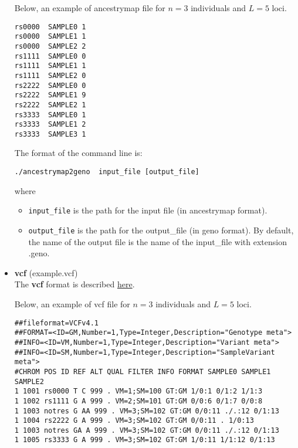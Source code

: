 \documentclass[10pt,a4paper]{article}
\begin{document}
\begin{itemize}
Below, an example of ancestrymap file for $n=3$ individuals and $L=5$ loci.
\begin{center}
\footnotesize
\begin{Verbatim}[frame=single]
rs0000  SAMPLE0 1
rs0000  SAMPLE1 1
rs0000  SAMPLE2 2
rs1111  SAMPLE0 0
rs1111  SAMPLE1 1
rs1111  SAMPLE2 0
rs2222  SAMPLE0 0
rs2222  SAMPLE1 9
rs2222  SAMPLE2 1
rs3333  SAMPLE0 1
rs3333  SAMPLE1 2
rs3333  SAMPLE3 1
\end{Verbatim}
\end{center}

The format of the command line is:
\begin{Verbatim}[frame=single]
./ancestrymap2geno  input_file [output_file]
\end{Verbatim}
where 
\begin{itemize}
\item \verb|input_file| is the path for the input file (in ancestrymap format).
\item \verb|output_file| is the path for the output\_file (in geno format). 
By default, the name of the output file is the name of the input\_file with extension .geno.
\end{itemize}

\item {\bf vcf} (example.vcf)\\
The {\bf vcf} format is described \href{http://www.1000genomes.org/wiki/Analysis/Variant\%20Call\%20Format/vcf-variant-call-format-version-41}{here}.

Below, an example of vcf file for $n=3$ individuals and $L=5$ loci.
\begin{center}
\footnotesize
\begin{Verbatim}[frame=single]
##fileformat=VCFv4.1 
##FORMAT=<ID=GM,Number=1,Type=Integer,Description="Genotype meta"> 
##INFO=<ID=VM,Number=1,Type=Integer,Description="Variant meta"> 
##INFO=<ID=SM,Number=1,Type=Integer,Description="SampleVariant meta"> 
#CHROM POS ID REF ALT QUAL FILTER INFO FORMAT SAMPLE0 SAMPLE1 SAMPLE2 
1 1001 rs0000 T C 999 . VM=1;SM=100 GT:GM 1/0:1 0/1:2 1/1:3 
1 1002 rs1111 G A 999 . VM=2;SM=101 GT:GM 0/0:6 0/1:7 0/0:8 
1 1003 notres G AA 999 . VM=3;SM=102 GT:GM 0/0:11 ./.:12 0/1:13 
1 1004 rs2222 G A 999 . VM=3;SM=102 GT:GM 0/0:11 . 1/0:13
1 1003 notres GA A 999 . VM=3;SM=102 GT:GM 0/0:11 ./.:12 0/1:13 
1 1005 rs3333 G A 999 . VM=3;SM=102 GT:GM 1/0:11 1/1:12 0/1:13 
\end{Verbatim}
\end{center}


\end{itemize}
\end{document}
